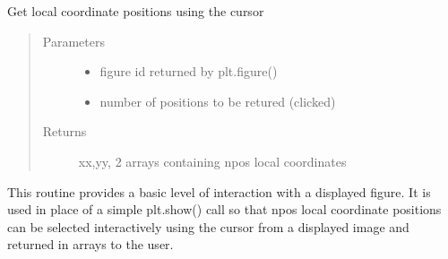 \documentclass[letterpaper,10pt,english]{sphinxmanual}
\begin{document}
\begin{fulllineitems}
\label{\detokenize{images_functions:images.plt_show_locator}}
Get local coordinate positions using the cursor
\begin{quote}\begin{description}
\item[{Parameters}] \leavevmode\begin{itemize}
\item {} 
 \textendash{} figure id returned by plt.figure()

\item {} 
 \textendash{} number of positions to be retured (clicked)

\end{itemize}

\item[{Returns}] \leavevmode
xx,yy,  2 arrays containing npos local coordinates

\end{description}\end{quote}

This routine provides a basic level of interaction with a displayed figure.
It is used in place of a simple plt.show() call so that npos local coordinate
positions can be selected interactively using the cursor from a displayed image
and returned in arrays to the user.

\end{fulllineitems}

\end{document}
